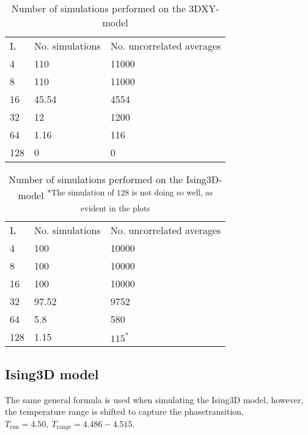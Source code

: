 \documentclass[a4paper]{article}
\newcommand{\trm}[1]{\textrm{#1}}
\begin{document}
\begin{table}[htpb]
\begin{center}
\begin{tabular}{l l l}
  L & No. simulations & No. uncorrelated averages\\
  4 & 110 & 11000\\
  8 & 110 & 11000\\
  16 & 45.54 & 4554\\
  32 & 12 & 1200\\
  64 & 1.16 & 116 \\
  128 & 0  & 0 \\
\end{tabular}
\end{center}
\caption{Number of simulations performed on the 3DXY-model}
\end{table}

\begin{table}[htpb]
\begin{center}
\begin{tabular}{l l l}
  L & No. simulations & No. uncorrelated averages\\
  4 & 100 & 10000\\
  8 & 100 & 10000\\
  16 & 100 & 10000\\
  32 & 97.52 & 9752 \\
  64 & 5.8 & 580 \\
  128 & 1.15  & $115^{*}$ \\
\end{tabular}
\end{center}
\caption{Number of simulations performed on the Ising3D-model  \textsuperscript{*The simulation of 128 is not doing so well, as evident in the plots}}
\end{table}
\subsection{Ising3D model}
The same general formula is used when simulating the Ising3D model, however, the temperature range is shifted to capture the phasetransition, $T_{\trm{run}} = 4.50, ~ T_{\trm{range}} = 4.486-4.515$.




\end{document}
